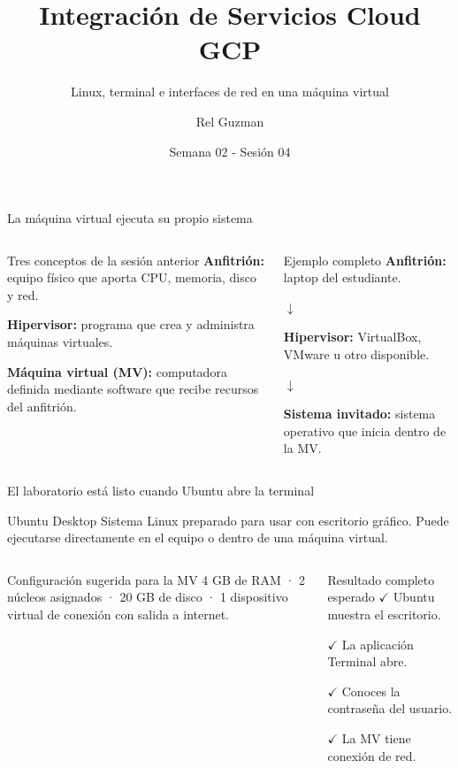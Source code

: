 \documentclass[aspectratio=169,10pt,c]{beamer}
\title{Integración de Servicios Cloud GCP}
\subtitle{Linux, terminal e interfaces de red en una máquina virtual}
\date{Semana 02 - Sesión 04}
\author{Rel Guzman}
\begin{document}
{\maketitle}

\begin{frame}{La máquina virtual ejecuta su propio sistema}
\begin{columns}[T,onlytextwidth]
\begin{block}{Tres conceptos de la sesión anterior}
\small
\textbf{Anfitrión:} equipo físico que aporta CPU, memoria, disco y red.\par\medskip
\textbf{Hipervisor:} programa que crea y administra máquinas virtuales.\par\medskip
\textbf{Máquina virtual (MV):} computadora definida mediante software que recibe recursos del anfitrión.
\end{block}
\begin{exampleblock}{Ejemplo completo}
\small
\textbf{Anfitrión:} laptop del estudiante.\par
$\downarrow$\par
\textbf{Hipervisor:} VirtualBox, VMware u otro disponible.\par
$\downarrow$\par
\textbf{Sistema invitado:} sistema operativo que inicia dentro de la MV.
\end{exampleblock}
\end{columns}
\end{frame}

\begin{frame}{El laboratorio está listo cuando Ubuntu abre la terminal}
\begin{alertblock}{Ubuntu Desktop}
\small Sistema Linux preparado para usar con escritorio gráfico. Puede ejecutarse directamente en el equipo o dentro de una máquina virtual.
\end{alertblock}
\begin{columns}[T,onlytextwidth]
\begin{block}{Configuración sugerida para la MV}
\small 4 GB de RAM · 2 núcleos asignados · 20 GB de disco · 1 dispositivo virtual de conexión con salida a internet.
\end{block}
\begin{exampleblock}{Resultado completo esperado}
\small
$\checkmark$ Ubuntu muestra el escritorio.\par
$\checkmark$ La aplicación Terminal abre.\par
$\checkmark$ Conoces la contraseña del usuario.\par
$\checkmark$ La MV tiene conexión de red.
\end{exampleblock}
\end{columns}
\end{frame}
\end{document}
